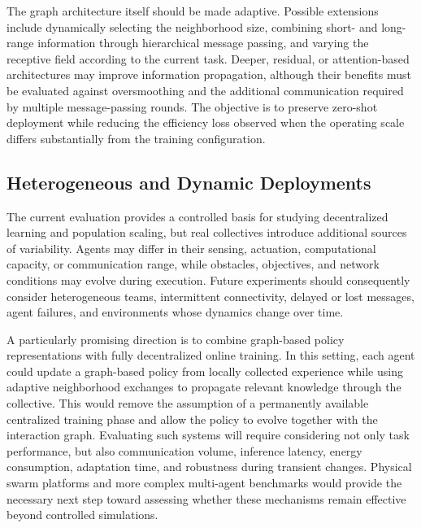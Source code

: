 The graph architecture itself should be made adaptive.
%
Possible extensions include dynamically selecting the neighborhood size,
 combining short- and long-range information through hierarchical message passing,
  and varying the receptive field according to the current task.
%
Deeper, residual, or attention-based architectures may improve information propagation,
 although their benefits must be evaluated against oversmoothing
  and the additional communication required by multiple message-passing rounds.
%
The objective is to preserve zero-shot deployment while reducing the efficiency loss observed
 when the operating scale differs substantially from the training configuration.

\subsection{Heterogeneous and Dynamic Deployments}

The current evaluation provides a controlled basis for studying decentralized learning and population scaling,
 but real collectives introduce additional sources of variability.
%
Agents may differ in their sensing, actuation, computational capacity, or communication range,
 while obstacles, objectives, and network conditions may evolve during execution.
%
Future experiments should consequently consider heterogeneous teams,
 intermittent connectivity, delayed or lost messages, agent failures,
 and environments whose dynamics change over time.

A particularly promising direction is to combine graph-based policy
 representations with fully decentralized online training.
%
In this setting,
 each agent could update a graph-based policy from locally collected experience
 while using adaptive neighborhood exchanges to propagate relevant knowledge through the collective.
%
This would remove the assumption of a permanently available centralized training phase
 and allow the policy to evolve together with the interaction graph.
%
Evaluating such systems will require considering not only task performance,
 but also communication volume, inference latency, energy consumption, adaptation time, and robustness during transient changes.
%
Physical swarm platforms and more complex multi-agent benchmarks would provide the necessary next step
 toward assessing whether these mechanisms remain effective beyond controlled simulations.